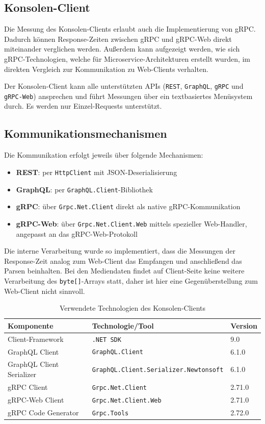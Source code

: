 \begin{enumerate}
	\subsection{Konsolen-Client}
	Die Messung des Konsolen-Clients erlaubt auch die Implementierung von gRPC. Dadurch können Response-Zeiten zwischen gRPC und gRPC-Web direkt miteinander verglichen werden. Außerdem kann aufgezeigt werden, wie sich gRPC-Technologien, welche für Microservice-Architekturen erstellt wurden, im direkten Vergleich zur Kommunikation zu Web-Clients verhalten. 
	
	Der Konsolen-Client kann alle unterstützten APIs (\texttt{REST}, \texttt{GraphQL}, \texttt{gRPC} und \texttt{gRPC-Web}) ansprechen und führt Messungen über ein textbasiertes Menüsystem durch.  
	Es werden nur Einzel-Requests unterstützt.
	
	\subsection*{Kommunikationsmechanismen}
	Die Kommunikation erfolgt jeweils über folgende Mechanismen:
	\begin{itemize}
		\item \textbf{REST}: per \texttt{HttpClient} mit JSON-Deserialisierung
		\item \textbf{GraphQL}: per \texttt{GraphQL.Client}-Bibliothek
		\item \textbf{gRPC}: über \texttt{Grpc.Net.Client} direkt als native gRPC-Kommunikation
		\item \textbf{gRPC-Web}: über \texttt{Grpc.Net.Client.Web} mittels spezieller Web-Handler, angepasst an das gRPC-Web-Protokoll
	\end{itemize}
	
	Die interne Verarbeitung wurde so implementiert, dass die Messungen der Response-Zeit analog zum Web-Client das Empfangen und anschließend das Parsen beinhalten.  
	Bei den Mediendaten findet auf Client-Seite keine weitere Verarbeitung des \texttt{byte[]}-Arrays statt, daher ist hier eine Gegenüberstellung zum Web-Client nicht sinnvoll.
	
	\begin{table}[h]
		\centering
		\caption{Verwendete Technologien des Konsolen-Clients}
		\begin{tabular}{lll}
			\hline
			\textbf{Komponente} & \textbf{Technologie/Tool} & \textbf{Version} \\
			\hline
			Client-Framework & \texttt{.NET~SDK} & 9.0 \\
			GraphQL Client & \texttt{GraphQL.Client} & 6.1.0 \\
			GraphQL Client Serializer & \texttt{GraphQL.Client.Serializer.Newtonsoft} & 6.1.0 \\
			gRPC Client & \texttt{Grpc.Net.Client} & 2.71.0 \\
			gRPC-Web Client & \texttt{Grpc.Net.Client.Web} & 2.71.0 \\
			gRPC Code Generator & \texttt{Grpc.Tools} & 2.72.0 \\
			\hline
		\end{tabular}
	\end{table}
	
\end{enumerate}

